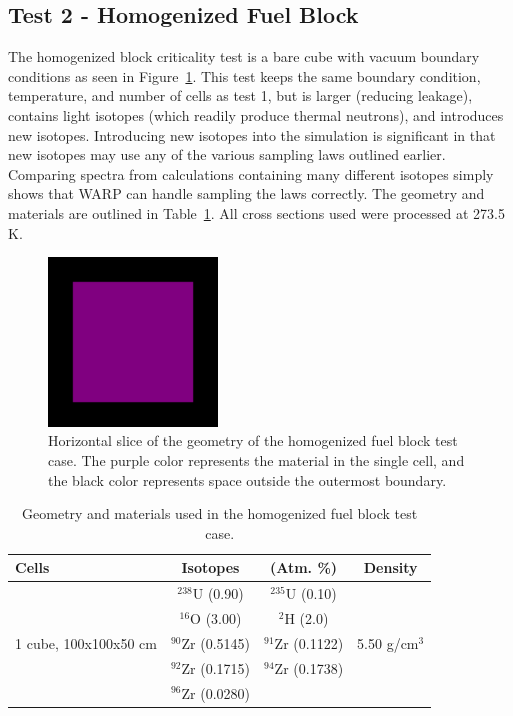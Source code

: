 \documentclass[preprint,12pt]{elsarticle}
\begin{document}
\newpage
\subsection{Test 2 - Homogenized Fuel Block}

The homogenized block criticality test is a bare cube with vacuum boundary conditions as seen in Figure~\ref{homfuel_geom_pic}.  This test keeps the same boundary condition, temperature, and number of cells as test 1, but is larger (reducing leakage), contains light isotopes (which readily produce thermal neutrons), and introduces new isotopes.  Introducing new isotopes into the simulation is significant in that new isotopes may use any of the various sampling laws outlined earlier.  Comparing spectra from calculations containing many different isotopes simply shows that WARP can handle sampling the laws correctly.  The geometry and materials are outlined in Table~\ref{homfuel_geom}.  All cross sections used were processed at 273.5 K.

\begin{figure}[!htbp] 
  \centering
    \includegraphics[width=0.4\textwidth]{graphics/homfuel-xy.png}
     \caption{ Horizontal slice of the geometry of the homogenized fuel block test case.  The purple color represents the material in the single cell, and the black color represents space outside the outermost boundary. \label{homfuel_geom_pic} }
\end{figure}

\begin{table}[h]
\centering
\caption{Geometry and materials used in the homogenized fuel block test case.}
\label{homfuel_geom}
\begin{tabular}{| l | c  c | c |}
\hline
Cells & Isotopes & (Atm. \%)& Density \\
\hline
\multirow{5}{*}{1 cube, 100x100x50 cm }            &   $^{238}$U   (0.90)   &  $^{235}$U   (0.10)   &  \multirow{5}{*}{5.50 g/cm$^3$} \\
                                                   &   $^{16}$O    (3.00)   &  $^{2}$H     (2.0)    &  \\
                                                   &   $^{90}$Zr   (0.5145) &  $^{91}$Zr   (0.1122) &  \\
                                                   &   $^{92}$Zr   (0.1715) &  $^{94}$Zr   (0.1738) &  \\
                                                   &   $^{96}$Zr   (0.0280) &                       &  \\
\hline
\end{tabular}
\end{table}
\end{document}
